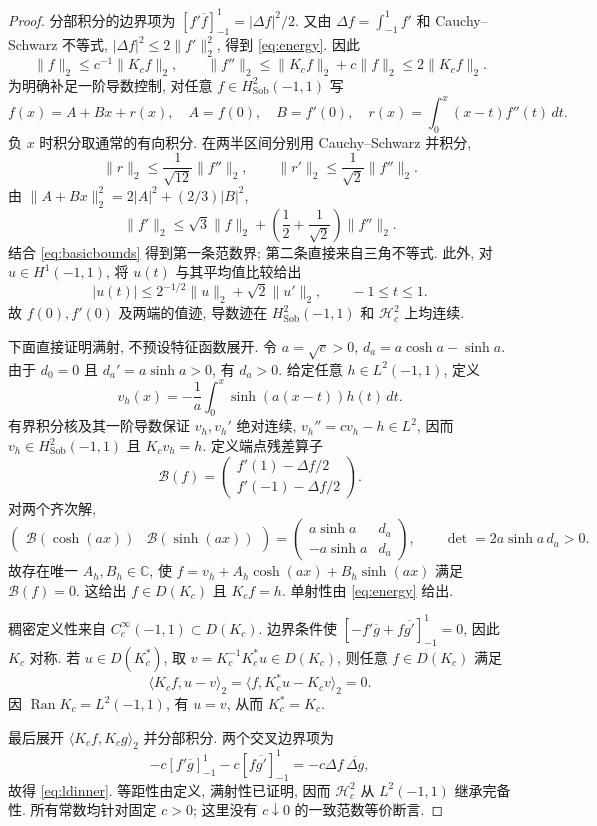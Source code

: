 \documentclass[UTF8,fontset=fandol,11pt,a4paper]{ctexart}
\theoremstyle{definition}
\newcommand{\C}{\mathbb C}
\newcommand{\Hs}{H^2_{\mathrm{Sob}}(-1,1)}
\newcommand{\Hc}{\mathcal H_c^2}
\newcommand{\LL}{L^2(-1,1)}
\newcommand{\Ran}{\operatorname{Ran}}
\newcommand{\ip}[2]{\langle #1,#2\rangle_2}
\newcommand{\norm}[1]{\lVert #1\rVert}
\newcommand{\Bc}{\mathcal B}
\begin{document}
\begin{proof}
分部积分的边界项为
$[f'\overline f]_{-1}^1=|\Delta f|^2/2$.
又由 $\Delta f=\int_{-1}^1f'$ 和 Cauchy--Schwarz 不等式,
$|\Delta f|^2\le2\norm{f'}_2^2$, 得到 \eqref{eq:energy}.
因此
\begin{equation}\label{eq:basicbounds}
\norm{f}_2\le c^{-1}\norm{K_cf}_2,\qquad
\norm{f''}_2\le\norm{K_cf}_2+c\norm{f}_2\le2\norm{K_cf}_2.
\end{equation}
为明确补足一阶导数控制, 对任意 $f\in\Hs$ 写
\[
f(x)=A+Bx+r(x),\quad A=f(0),\quad B=f'(0),\quad
r(x)=\int_0^x(x-t)f''(t)\,dt.
\]
负 $x$ 时积分取通常的有向积分. 在两半区间分别用 Cauchy--Schwarz 并积分,
\[
\norm{r}_2\le\frac1{\sqrt{12}}\norm{f''}_2,\qquad
\norm{r'}_2\le\frac1{\sqrt2}\norm{f''}_2.
\]
由 $\norm{A+Bx}_2^2=2|A|^2+(2/3)|B|^2$,
\begin{equation}\label{eq:interp}
\norm{f'}_2\le\sqrt3\norm{f}_2+
\left(\frac12+\frac1{\sqrt2}\right)\norm{f''}_2.
\end{equation}
结合 \eqref{eq:basicbounds} 得到第一条范数界; 第二条直接来自三角不等式.
此外, 对 $u\in H^1(-1,1)$, 将 $u(t)$ 与其平均值比较给出
\begin{equation}\label{eq:tracebound}
|u(t)|\le2^{-1/2}\norm{u}_2+\sqrt2\norm{u'}_2,
\qquad -1\le t\le1.
\end{equation}
故 $f(0),f'(0)$ 及两端的值迹, 导数迹在 $\Hs$ 和 $\Hc$ 上均连续.

下面直接证明满射, 不预设特征函数展开. 令 $a=\sqrt c>0$,
$d_a=a\cosh a-\sinh a$. 由于 $d_0=0$ 且
$d_a'=a\sinh a>0$, 有 $d_a>0$.
给定任意 $h\in\LL$, 定义
\[
v_h(x)=-\frac1a\int_0^x\sinh(a(x-t))h(t)\,dt.
\]
有界积分核及其一阶导数保证 $v_h,v_h'$ 绝对连续,
$v_h''=cv_h-h\in L^2$, 因而 $v_h\in\Hs$ 且 $K_cv_h=h$.
定义端点残差算子
\begin{equation}\label{eq:boundary}
\Bc(f)=\begin{pmatrix}f'(1)-\Delta f/2\\ f'(-1)-\Delta f/2\end{pmatrix}.
\end{equation}
对两个齐次解,
\[
\begin{pmatrix}\Bc(\cosh(ax))&\Bc(\sinh(ax))\end{pmatrix}
=\begin{pmatrix}a\sinh a&d_a\\-a\sinh a&d_a\end{pmatrix},
\qquad \det=2a\sinh a\,d_a>0.
\]
故存在唯一 $A_h,B_h\in\C$, 使
$f=v_h+A_h\cosh(ax)+B_h\sinh(ax)$ 满足 $\Bc(f)=0$.
这给出 $f\in D(K_c)$ 且 $K_cf=h$. 单射性由 \eqref{eq:energy} 给出.

稠密定义性来自 $C_c^\infty(-1,1)\subset D(K_c)$.
边界条件使
$[-f'\overline g+f\overline{g'}]_{-1}^1=0$, 因此 $K_c$ 对称.
若 $u\in D(K_c^*)$, 取 $v=K_c^{-1}K_c^*u\in D(K_c)$, 则任意
$f\in D(K_c)$ 满足
\[
\ip{K_cf}{u-v}=\ip{f}{K_c^*u-K_cv}=0.
\]
因 $\Ran K_c=\LL$, 有 $u=v$, 从而 $K_c^*=K_c$.

最后展开 $\ip{K_cf}{K_cg}$ 并分部积分. 两个交叉边界项为
\[
-c[f'\overline g]_{-1}^1-c[f\overline{g'}]_{-1}^1
=-c\Delta f\,\overline{\Delta g},
\]
故得 \eqref{eq:ldinner}. 等距性由定义, 满射性已证明, 因而
$\Hc$ 从 $\LL$ 继承完备性. 所有常数均针对固定 $c>0$;
这里没有 $c\downarrow0$ 的一致范数等价断言.
\end{proof}
\end{document}
